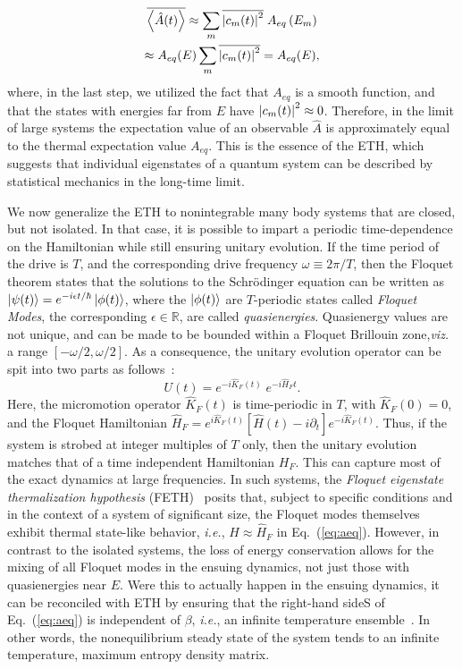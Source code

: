 \documentclass[%
reprint,
superscriptaddress,
amsmath,amssymb,
aps,
prb,
showkeys,
]{revtex4-2}
\begin{document}
\begin{multline*}
	\overline{\expval{\hat{A}(t)}} \approx \sum_m \overline{\abs{c_m(t)}^2}\; {A}_{eq}\left(E_m\right)\\
	\approx {A}_{eq}(E)\sum_m \overline{\abs{c_m(t)}^2} = A_{eq}(E),
\end{multline*}
where, in the last step, we utilized the fact that $A_{eq}$ is a smooth function, and that the states with energies far from $E$ have $\abs{c_m(t)}^2\approx 0$. Therefore, in the limit of large systems the expectation value of an observable $\hat{A}$ is approximately equal to the thermal expectation value $A_{eq}$. This is the essence of the ETH, which suggests that individual eigenstates of a quantum system can be described by statistical mechanics in the long-time limit.

We now generalize the ETH to nonintegrable many body systems that are closed, but not isolated. In that case, it is possible to impart a periodic time-dependence on the Hamiltonian while still ensuring unitary evolution. If the time period of the drive is $T$, and the corresponding drive frequency $\omega\equiv 2\pi/T$, then the Floquet theorem states that the solutions to the Schr\"{o}dinger equation can be written as $\ket{\psi(t)} = e^{-i\epsilon t/\hbar} \ket{\phi(t)}$, where the $\ket{\phi(t)}$ are $T$-periodic states called \textit{Floquet Modes}, the corresponding $\epsilon\in \mathbb{R}$, are called \textit{quasienergies}. Quasienergy values are not unique, and can be made to be bounded within a Floquet {Brillouin zone},\textit{viz.} a range $[-\omega/2, \omega/2]$\cite{holthaus_floquet_2016,vogl_effective_2020}. As a consequence, the unitary evolution operator can be spit into two parts as follows~\cite{Bukov2014}:
\begin{equation}
	\label{eq:propagator}
	U(t) = e^{-i\hat{K}_F(t)}\;e^{-i\hat{H}_Ft}.
\end{equation}
Here, the micromotion operator $\hat{K}_F(t)$ is time-periodic in $T$, with $\hat{K}_F(0)=0$, and the Floquet Hamiltonian  {$\hat{H}_F = e^{i\hat{K}_F(t)} \left[\hat{H}(t)-i\partial_t\right] e^{-i \hat{K}_F(t)}$}. Thus, if the system is strobed at integer multiples of $T$ only, then the unitary evolution matches that of a time independent Hamiltonian $H_F$. This can capture most of the exact dynamics at large frequencies. In such systems, the \textit{Floquet eigenstate thermalization hypothesis} (FETH)~\cite{Mori_2018, Mori_2023_1} posits that, subject to specific conditions and in the context of a system of significant size, the Floquet modes themselves exhibit thermal state-like behavior, \textit{i.e.}, $\hat{H}\approx \hat{H}_F$ in Eq.~(\ref{eq:aeq}). However, in contrast to the isolated systems, the loss of energy conservation allows for the mixing of all Floquet modes in the ensuing dynamics, not just those with quasienergies near $E$. Were this to actually happen in the ensuing dynamics,  it can be reconciled with ETH by ensuring that the right-hand sideS of Eq.~(\ref{eq:aeq}) is independent of $\beta$, \textit{i.e.}{, an infinite temperature ensemble}~\cite{alessio}. In other words, the nonequilibrium steady state of the system tends to an infinite temperature, maximum entropy density matrix.
\end{document}
